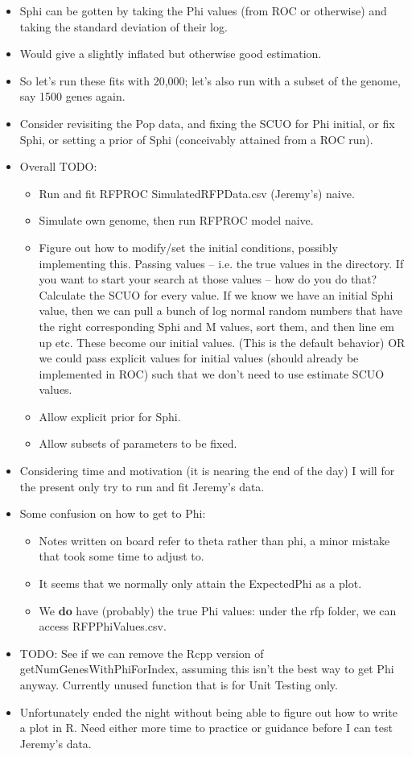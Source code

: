 \documentclass[12pt,hyperref]{labbook}
\begin{document}
\begin{itemize}
    \item Sphi can be gotten by taking the Phi values (from ROC or otherwise) and taking the standard deviation of their log.
    \item Would give a slightly inflated but otherwise good estimation.
    \item So let's run these fits with 20,000; let's also run with a subset of the genome, say 1500 genes again.
    \item Consider revisiting the Pop data, and fixing the SCUO for Phi initial, or fix Sphi, or setting a prior of Sphi (conceivably attained from a ROC run).
    \item Overall TODO:
    \begin{itemize}
        \item Run and fit RFPROC SimulatedRFPData.csv (Jeremy's) naive.
        \item Simulate own genome, then run RFPROC model naive.
        \item Figure out how to modify/set the initial conditions, possibly implementing this.
        Passing values -- i.e. the true values in the directory.
        If you want to start your search at those values -- how do you do that?
        Calculate the SCUO for every value.
        If we know we have an initial Sphi value, then we can pull a bunch of log normal random numbers that have the right corresponding Sphi and M values, sort them, and then line em up etc.
        These become our initial values.
        (This is the default behavior)
        OR we could pass explicit values for initial values (should already be implemented in ROC) such that we don't need to use estimate SCUO values.
        \item Allow explicit prior for Sphi.
        \item Allow subsets of parameters to be fixed.
    \end{itemize}
    \item Considering time and motivation (it is nearing the end of the day) I will for the present only try to run and fit Jeremy's data.
    \item Some confusion on how to get to Phi:
    \begin{itemize}
        \item Notes written on board refer to theta rather than phi, a minor mistake that took some time to adjust to.
        \item It seems that we normally only attain the ExpectedPhi as a plot.
        \item We \textbf{do} have (probably) the true Phi values: under the rfp folder, we can access RFPPhiValues.csv.
    \end{itemize}
    \item TODO: See if we can remove the Rcpp version of getNumGenesWithPhiForIndex, assuming this isn't the best way to get Phi anyway.
    Currently unused function that is for Unit Testing only.
    \item Unfortunately ended the night without being able to figure out how to write a plot in R. Need either more time to practice or guidance before I can test Jeremy's data.
\end{itemize}
\end{document}
